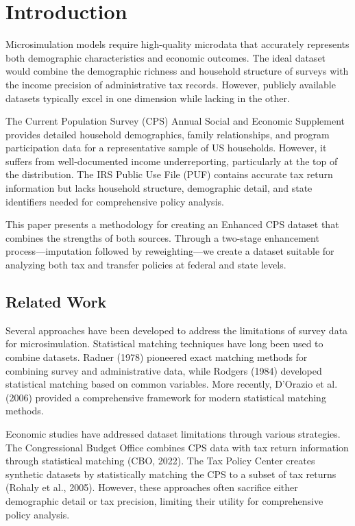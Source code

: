 \section{Introduction}

Microsimulation models require high-quality microdata that accurately represents both demographic characteristics and economic outcomes. The ideal dataset would combine the demographic richness and household structure of surveys with the income precision of administrative tax records. However, publicly available datasets typically excel in one dimension while lacking in the other.

The Current Population Survey (CPS) Annual Social and Economic Supplement provides detailed household demographics, family relationships, and program participation data for a representative sample of US households. However, it suffers from well-documented income underreporting, particularly at the top of the distribution. The IRS Public Use File (PUF) contains accurate tax return information but lacks household structure, demographic detail, and state identifiers needed for comprehensive policy analysis.

This paper presents a methodology for creating an Enhanced CPS dataset that combines the strengths of both sources. Through a two-stage enhancement process—imputation followed by reweighting—we create a dataset suitable for analyzing both tax and transfer policies at federal and state levels.

\subsection{Related Work}

Several approaches have been developed to address the limitations of survey data for microsimulation. Statistical matching techniques have long been used to combine datasets. Radner (1978) pioneered exact matching methods for combining survey and administrative data, while Rodgers (1984) developed statistical matching based on common variables. More recently, D'Orazio et al. (2006) provided a comprehensive framework for modern statistical matching methods.

Economic studies have addressed dataset limitations through various strategies. The Congressional Budget Office combines CPS data with tax return information through statistical matching (CBO, 2022). The Tax Policy Center creates synthetic datasets by statistically matching the CPS to a subset of tax returns (Rohaly et al., 2005). However, these approaches often sacrifice either demographic detail or tax precision, limiting their utility for comprehensive policy analysis.

